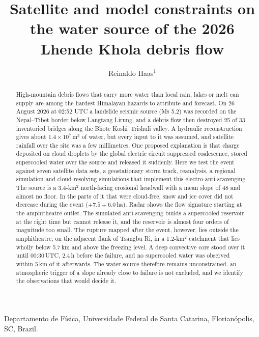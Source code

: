 \documentclass{nature}
\title{Satellite and model constraints on the water source of the 2026 Lhende Khola debris flow}
\author{Reinaldo Haas$^{1}$}
\begin{document}
\maketitle

\begin{affiliations}
 \item Departamento de F\'isica, Universidade Federal de Santa Catarina, Florian\'opolis, SC, Brazil.
\end{affiliations}

\begin{abstract}
High-mountain debris flows that carry more water than local rain, lakes or melt can supply are among the hardest Himalayan hazards to attribute and forecast\cite{shugar2021,iverson1997}. On 26 August 2026 at 02:52 UTC a landslide seismic source (Ms 5.2) was recorded on the Nepal--Tibet border below Langtang Lirung\cite{usgs2026}, and a debris flow then destroyed 25 of 33 inventoried bridges along the Bhote Koshi--Trishuli valley. A hydraulic reconstruction gives about $1.4\times10^{7}$\,m$^{3}$ of water, but every input to it was assumed, and satellite rainfall over the site was a few millimetres\cite{huffman2019,haas2026repo}. One proposed explanation is that charge deposited on cloud droplets by the global electric circuit suppressed coalescence, stored supercooled water over the source and released it suddenly\cite{tinsley2000,tinsley2008}. Here we test the event against seven satellite data sets, a geostationary storm track, reanalysis, a regional simulation and cloud-resolving simulations that implement this electro-anti-scavenging. The source is a 3.4-km$^{2}$ north-facing erosional headwall with a mean slope of 48\textdegree{} and almost no floor. In the parts of it that were cloud-free, snow and ice cover did not decrease during the event ($+7.5\pm6.0$\,ha). Radar shows the flow signature starting at the amphitheatre outlet. The simulated anti-scavenging builds a supercooled reservoir at the right time but cannot release it, and the reservoir is almost four orders of magnitude too small. The rupture mapped after the event, however, lies outside the amphitheatre, on the adjacent flank of Tsangbu Ri, in a 1.2-km$^{2}$ catchment that lies wholly below 5.7\,km and above the freezing level. A deep convective core stood over it until 00:30\,UTC, 2.4\,h before the failure, and no supercooled water was observed within 5\,km of it afterwards. The water source therefore remains unconstrained, an atmospheric trigger of a slope already close to failure is not excluded, and we identify the observations that would decide it.
\end{abstract}
\end{document}
